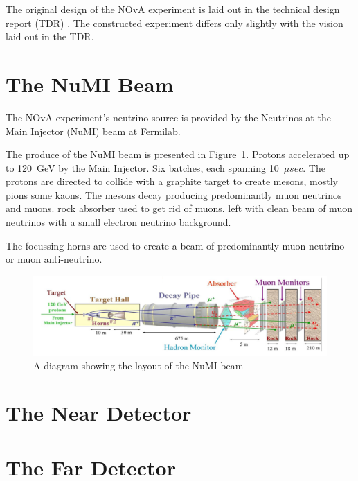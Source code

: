 
The original design of the NOvA experiment is laid out in the technical
design report (TDR) \cite{TDR}. The constructed experiment
differs only slightly with the vision laid out in the TDR.

\section{The NuMI Beam}

The NOvA experiment's neutrino source is provided by the Neutrinos at
the Main Injector (NuMI) beam at Fermilab.

The produce of the NuMI beam is presented in Figure~\ref{fig:NuMI}.
Protons accelerated up to 120~GeV by the Main Injector. Six batches,
each spanning 10~$\mu sec$. The protons are directed to collide with a
graphite target to create mesons, mostly pions some kaons. 
The mesons
decay producing predominantly muon neutrinos and muons. rock absorber
used to get rid of muons. left with clean beam of muon neutrinos with a
small electron neutrino background.

The focussing horns are used to create a beam of predominantly muon
neutrino or muon anti-neutrino.

\begin{figure}[!ht]
  \centering
  \includegraphics[width=1\textwidth]{../../img/beam/beam_diagram.png}
  \caption{A diagram showing the layout of the NuMI beam}
  \label{fig:NuMI}
\end{figure}





\section{The Near Detector}

\section{The Far Detector}
